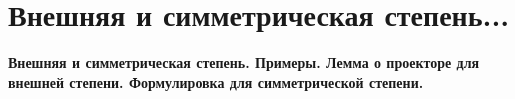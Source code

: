 \section{
 Внешняя и симметрическая степень... %
}
\textbf{Внешняя и симметрическая степень. Примеры. Лемма о проекторе для внешней степени. Формулировка для симметрической степени.}

